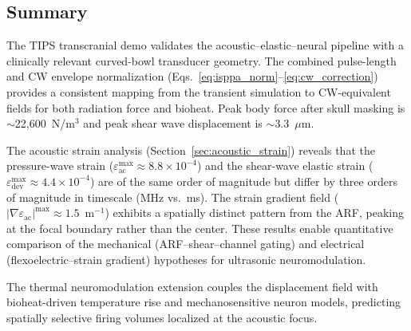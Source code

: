 \documentclass[11pt]{article}
\begin{document}
\subsection{Summary}

The TIPS transcranial demo validates the acoustic--elastic--neural pipeline
with a clinically relevant curved-bowl transducer geometry.
The combined pulse-length and CW envelope normalization
(Eqs.~\ref{eq:isppa_norm}--\ref{eq:cw_correction}) provides a
consistent mapping from the transient simulation to CW-equivalent fields for
both radiation force and bioheat.  Peak body force after skull masking is
$\sim$22{,}600~N/m$^3$ and peak shear wave displacement is $\sim$3.3~$\mu$m.

The acoustic strain analysis (Section~\ref{sec:acoustic_strain}) reveals
that the pressure-wave strain ($\varepsilon_{\mathrm{ac}}^{\max} \approx
8.8 \times 10^{-4}$) and the shear-wave elastic strain
($\varepsilon_{\mathrm{dev}}^{\max} \approx 4.4 \times 10^{-4}$) are of the
same order of magnitude but differ by three orders of magnitude in
timescale (MHz vs.\ ms).  The strain gradient field
($|\nabla\varepsilon_{\mathrm{ac}}|^{\max} \approx 1.5$~m$^{-1}$) exhibits
a spatially distinct pattern from the ARF, peaking at the focal boundary
rather than the center.  These results enable quantitative comparison of
the mechanical (ARF--shear--channel gating) and electrical
(flexoelectric--strain gradient) hypotheses for ultrasonic neuromodulation.

The thermal neuromodulation extension couples the displacement field
with bioheat-driven temperature rise and mechanosensitive neuron models,
predicting spatially selective firing volumes localized at the acoustic
focus.
\end{document}
